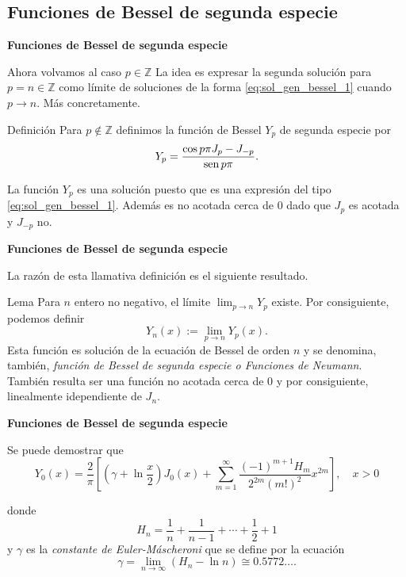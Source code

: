 \subsection{Funciones de Bessel  de segunda especie}
\begin{frame}[fragile]{\textbf{Funciones de Bessel  de segunda especie}}

Ahora volvamos al caso $p\in\mathbb{Z}$ La idea es expresar la segunda solución para  $p=n\in\mathbb{Z}$ como límite de soluciones  de la forma  \eqref{eq:sol_gen_bessel_1} cuando $p\to n$. Más concretamente.

\begin{block}{Definición} Para $p\notin\mathbb{Z}$ definimos la función de Bessel $Y_p$ de segunda especie por
\begin{equation}\label{eq:bessel_2_especie}
Y_p=\frac{\cos p\pi J_p-J_{-p}}{\operatorname{sen} p\pi}.
\end{equation}
\end{block}

La función $Y_p$ es una solución puesto que es una expresión del tipo \eqref{eq:sol_gen_bessel_1}. Además es no acotada cerca de $0$ dado que $J_p$ es acotada y $J_{-p}$ no. 

\end{frame}





\begin{frame}[fragile]{\textbf{Funciones de Bessel  de segunda especie}}


La razón de esta llamativa definición es el siguiente resultado.




\begin{block}{Lema} Para $n$ entero no negativo,  el  límite $\lim_{p\to n}Y_p$ existe. Por consiguiente, podemos definir
\begin{equation}\label{eq:bessel_2_especie_b}
Y_n(x):=\lim_{p\to n}Y_p(x).
\end{equation}
Esta función es solución de la ecuación de Bessel de orden $n$ y se denomina, también, \emph{función de Bessel de segunda especie o Funciones de Neumann}. También resulta ser una función no acotada cerca de $0$ y por consiguiente, linealmente idependiente de $J_n$.
\end{block}


\end{frame}



\begin{frame}[fragile]{\textbf{Funciones de Bessel  de segunda especie}}


Se puede demostrar que 
$$
Y_{0}(x)=\frac{2}{\pi}\left[\left(\gamma+\ln \frac{x}{2}\right) J_{0}(x)+\sum_{m=1}^{\infty} \frac{(-1)^{m+1} H_{m}}{2^{2 m}(m !)^{2}} x^{2 m}\right], \quad x>0
$$



donde
$$
H_{n}=\frac{1}{n}+\frac{1}{n-1}+\cdots+\frac{1}{2}+1
$$
y  $\gamma$ es la \emph{constante de Euler-Máscheroni} que se define por la ecuación
$$
\gamma=\lim _{n \rightarrow \infty}\left(H_{n}-\ln n\right) \cong 0.5772\ldots .
$$
\end{frame}

